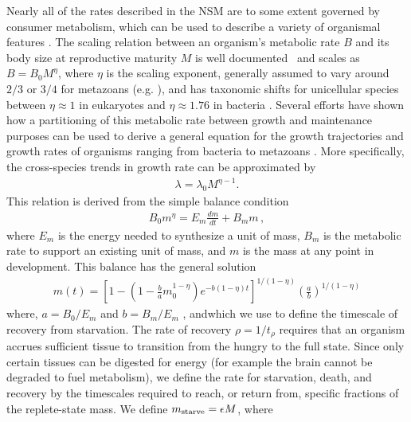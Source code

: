 \documentclass{pnastwo}
\begin{document}
\begin{article}
Nearly all of the rates described in the NSM are to some extent governed by
consumer metabolism, which can be used to describe a variety of organismal
features \cite{Brown:2004wq}.  The scaling relation between an organism's
metabolic rate $B$ and its body size at reproductive maturity $M$ is well
documented~\cite{West:2002it} and scales as $B = B_0 M^\eta$, where $\eta$ is
the scaling exponent, generally assumed to vary around $2/3$ or $3/4$ for
metazoans (e.g. \cite{Brown:2004wq}), and has taxonomic shifts for unicellular species
between $\eta\approx 1$ in eukaryotes and $\eta\approx 1.76$ in bacteria
\cite{DeLong:2010dy,Kempes:2012hy}. Several efforts have shown how a
partitioning of this metabolic rate between growth and maintenance purposes
can be used to derive a general equation for the growth trajectories and
growth rates of organisms ranging from bacteria to metazoans
\cite{West:2001bv,moses2008rmo,gillooly2002esa,hou,Kempes:2012hy}. More specifically, the cross-species trends in growth rate can be
approximated by
\begin{eqnarray}
\lambda = \lambda_0 M^{\eta-1}.
\label{lambda}
\end{eqnarray}
This relation is derived from the simple balance condition \cite{West:2001bv,moses2008rmo,gillooly2002esa,hou,Kempes:2012hy}
\begin{eqnarray}
\label{balance}
B_{0}m^{\eta}=E_{m}\frac{dm}{dt}+B_{m}m\,,
\end{eqnarray}
where $E_{m}$ is the energy needed to synthesize a unit of mass, $B_{m}$ is
the metabolic rate to support an existing unit of mass, and $m$ is the mass
at any point in development.  This balance has the general solution \cite{moses2008rmo, Kempes:2012hy}
\begin{eqnarray}
m\left(t\right)\!=\left[1\!-\!\left(1\!-\!\frac{b}{a}m_{0}^{1\!-\!\eta}\right)e^{-b\left(1\!-\!\eta\right)t}\right]^{1/\left(1-\eta\right)}\!\left(\!\frac{a}{b}\!\right)^{1/(1-\eta)}
\end{eqnarray}
where, $a=B_{0}/E_{m}$ and $b=B_{m}/E_{m}$ , andwhich we use to define the timescale of recovery from starvation. The rate of recovery $\rho = 1/t_\rho$ requires that an organism accrues
sufficient tissue to transition from the hungry to the full state.  Since only certain tissues can be digested for energy (for example the brain
cannot be degraded to fuel metabolism), we define the rate for starvation,
death, and recovery by the timescales required to reach, or return from, specific fractions of the
replete-state mass. We define $m_{\rm starve}=\epsilon M$, where

\end{article}
\end{document}
